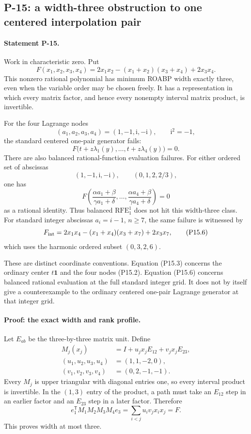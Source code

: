 \subsection{P-15: a width-three obstruction to one centered interpolation pair}
\paragraph{Statement P-15.}
Work in characteristic zero. Put
\[
 F(x_1,x_2,x_3,x_4)
   =2x_1x_2-(x_1+x_2)(x_3+x_4)+2x_3x_4.
 \tag{P15.1}
\]
This nonzero rational polynomial has minimum ROABP width exactly
three, even when the variable order may be chosen freely. It has
a representation in which every matrix factor, and hence every
nonempty interval matrix product, is invertible.

For the four Lagrange nodes
\[
 (a_1,a_2,a_3,a_4)=(1,-1,\mathrm i,-\mathrm i),
 \qquad \mathrm i^2=-1,
 \tag{P15.2}
\]
the standard centered one-pair generator fails:
\[
 F\bigl(t+z\lambda_1(y),\ldots,t+z\lambda_4(y)\bigr)=0.
 \tag{P15.3}
\]
There are also balanced rational-function evaluation failures.
For either ordered set of abscissas
\[
 (1,-1,\mathrm i,-\mathrm i),\qquad (0,1,2,2/3),
 \tag{P15.4}
\]
one has
\[
 F\left(\frac{\alpha a_1+\beta}{\gamma a_1+\delta},
        \ldots,
        \frac{\alpha a_4+\beta}{\gamma a_4+\delta}\right)=0
 \tag{P15.5}
\]
as a rational identity. Thus balanced $\mathrm{RFE}_1^1$ does not
hit this width-three class. For standard integer abscissas
$a_i=i-1$, $n\geq7$, the same failure is witnessed by
\[
 F_{\rm int}
   =2x_1x_4-(x_1+x_4)(x_3+x_7)+2x_3x_7,
 \tag{P15.6}
\]
which uses the harmonic ordered subset $(0,3,2,6)$.

These are distinct coordinate conventions. Equation (P15.3)
concerns the ordinary center $t\mathbf1$ and the four nodes
(P15.2). Equation (P15.6) concerns balanced rational evaluation
at the full standard integer grid. It does not by itself give
a counterexample to the ordinary centered one-pair Lagrange
generator at that integer grid.

\paragraph{Proof: the exact width and rank profile.}
Let $E_{ab}$ be the three-by-three matrix unit. Define
\[
 \begin{aligned}
 M_j(x_j)&=I+u_jx_jE_{12}+v_jx_jE_{23},\\
 (u_1,u_2,u_3,u_4)&=(1,1,-2,0),\\
 (v_1,v_2,v_3,v_4)&=(0,2,-1,-1).
 \end{aligned}
 \tag{P15.7}
\]
Every $M_j$ is upper triangular with diagonal entries one,
so every interval product is invertible. In the $(1,3)$ entry
of the product, a path must take an $E_{12}$ step in an earlier
factor and an $E_{23}$ step in a later factor. Therefore
\[
 e_1^{\mathsf T}M_1M_2M_3M_4e_3
    =\sum_{i<j}u_iv_jx_ix_j=F.
 \tag{P15.8}
\]
This proves width at most three.

